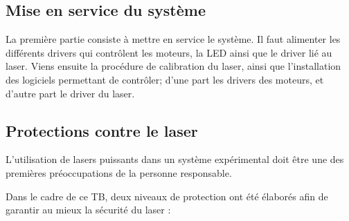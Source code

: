 \subsection{Mise en service du système}

La première partie consiste à mettre en service le système. Il faut alimenter les différents drivers qui contrôlent les moteurs, la LED ainsi que le driver lié au laser. Viens ensuite la procédure de calibration du laser, ainsi que l'installation des logiciels permettant de contrôler; d'une part les drivers des moteurs, et d'autre part le driver du laser.

\subsection{Protections contre le laser}
L'utilisation de lasers puissants dans un système expérimental doit être une des premières préoccupations de la personne responsable.

Dans le cadre de ce TB, deux niveaux de protection ont été élaborés afin de garantir au mieux la sécurité du laser :


